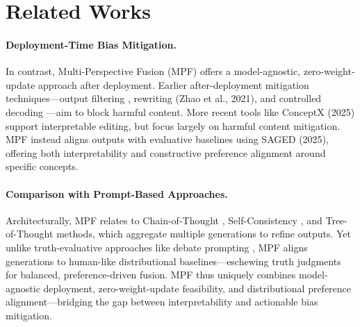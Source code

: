 \section{Related Works}





\paragraph{Deployment-Time Bias Mitigation.} In contrast, Multi-Perspective Fusion (MPF) offers a model-agnostic, zero-weight-update approach after deployment. Earlier after-deployment mitigation techniques—output filtering \cite{gehman-etal-2020-realtoxicityprompts}, rewriting (Zhao et al., 2021), and controlled decoding \cite{he-etal-2022-ctrlsum}—aim to block harmful content. More recent tools like ConceptX (2025) support interpretable editing, but focus largely on harmful content mitigation. MPF instead aligns outputs with evaluative baselines using SAGED (2025), offering both interpretability and constructive preference alignment around specific concepts.
\paragraph{Comparison with Prompt-Based Approaches.} Architecturally, MPF relates to Chain-of-Thought \cite{wei2022chain, kojima2022large}, Self-Consistency \cite{wang2022self}, and Tree-of-Thought \cite{yao2023tree} methods, which aggregate multiple generations to refine outputs. Yet unlike truth-evaluative approaches like debate prompting \cite{madaan2023self, bai2022constitutional, khan2024debating}, MPF aligns generations to human-like distributional baselines—eschewing truth judgments for balanced, preference-driven fusion. MPF thus uniquely combines model-agnostic deployment, zero-weight-update feasibility, and distributional preference alignment—bridging the gap between interpretability and actionable bias mitigation.